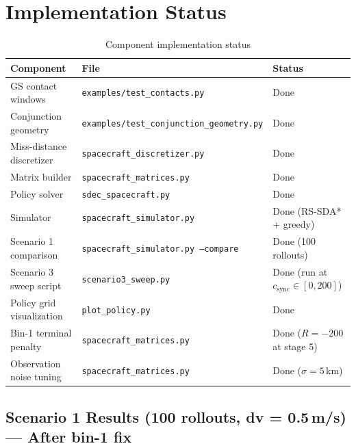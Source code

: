\documentclass[11pt]{article}
\begin{document}
\section{Implementation Status}

\begin{table}[h]
\centering
\caption{Component implementation status}
\begin{tabular}{lll}
\toprule
Component & File & Status \\
\midrule
GS contact windows & \texttt{examples/test\_contacts.py} & Done \\
Conjunction geometry & \texttt{examples/test\_conjunction\_geometry.py} & Done \\
Miss-distance discretizer & \texttt{spacecraft\_discretizer.py}    & Done \\
Matrix builder           & \texttt{spacecraft\_matrices.py}       & Done \\
Policy solver            & \texttt{sdec\_spacecraft.py}           & Done \\
Simulator                & \texttt{spacecraft\_simulator.py}      & Done (RS-SDA* + greedy) \\
Scenario 1 comparison    & \texttt{spacecraft\_simulator.py --compare} & Done (100 rollouts) \\
Scenario 3 sweep script  & \texttt{scenario3\_sweep.py}           & Done (run at $c_\text{sync} \in [0,200]$) \\
Policy grid visualization & \texttt{plot\_policy.py}              & Done \\
Bin-1 terminal penalty   & \texttt{spacecraft\_matrices.py}       & Done ($R = -200$ at stage 5) \\
Observation noise tuning & \texttt{spacecraft\_matrices.py}       & Done ($\sigma = 5$\,km) \\
\bottomrule
\end{tabular}
\end{table}

\subsection*{Scenario 1 Results (100 rollouts, dv = 0.5\,m/s) --- After bin-1 fix}
\end{document}

